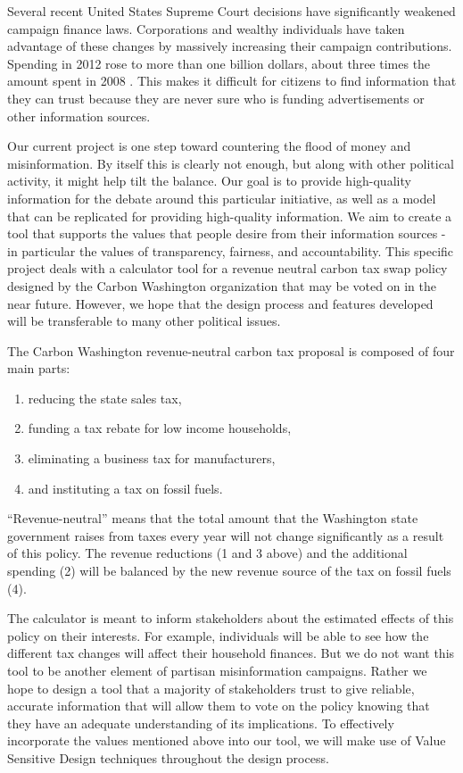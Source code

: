 \documentclass{sigchi}
\begin{document}
Several recent United States Supreme Court decisions \cite{supremeCourt} have 
significantly weakened campaign finance laws. Corporations and wealthy individuals 
have taken advantage of these changes by massively increasing their campaign contributions. 
Spending in 2012 rose to more than one billion dollars, about three times the amount spent in 2008 
\cite{spending}. This makes it difficult for citizens to find information 
that they can trust because they are never sure who is funding advertisements or other information sources.

Our current project is one step toward countering the flood of money and misinformation. By itself this is clearly not enough, but along with other political activity, it might help tilt the balance. Our goal is to provide high-quality information for the debate around this particular initiative, as well as a model that can be replicated for providing high-quality information. We aim to create a tool that 
supports the values that people desire from their information sources - in particular the values 
of transparency, fairness, and accountability. This specific project 
deals with a calculator tool for a revenue neutral carbon tax swap policy designed by the Carbon Washington organization 
that may be voted on in the near future. However, we hope that the design process and features developed will be transferable 
to many other political issues.

The Carbon Washington revenue-neutral carbon tax proposal is composed of four main parts: 
\begin{enumerate}
\item reducing the state sales tax,
\item funding a tax rebate for low income households,
\item eliminating a business tax for manufacturers,
\item and instituting a tax on fossil fuels.
\end{enumerate}
``Revenue-neutral'' means that the total amount that the Washington state government raises 
from taxes every year will not change significantly as a result of this policy. The revenue 
reductions (1 and 3 above) and the additional spending (2) will be balanced by the new 
revenue source of the tax on fossil fuels (4).  

The calculator is meant to inform stakeholders about the estimated effects of this policy 
on their interests. For example, individuals will be able to see how the different tax changes will affect their 
household finances. But we do not want this tool to be another element of partisan misinformation campaigns. Rather we hope to design a tool that a majority of stakeholders trust to give reliable, accurate information 
that will allow them to vote on the policy knowing that they have an adequate understanding of its implications. 
To effectively incorporate the values mentioned above into our tool, we will make use of Value Sensitive Design 
techniques throughout the design process. 
\end{document}
